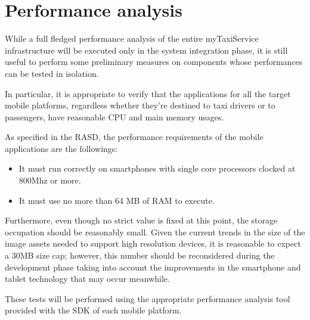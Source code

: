 \chapter{Performance analysis}
While a full fledged performance analysis of the entire myTaxiService infrastructure will be executed only in the system integration phase, it is still useful to perform some preliminary measures on components whose performances can be tested in isolation.

In particular, it is appropriate to verify that the applications for all the target mobile platforms, regardless whether they're destined to taxi drivers or to passengers, have reasonable CPU and main memory usages. 

As specified in the RASD, the performance requirements of the mobile applications are the followings:
\begin{itemize}
	\item It must run correctly on smartphones with single core processors clocked at 800Mhz or more.
	\item It must use no more than 64 MB of RAM to execute.
\end{itemize}

Furthermore, even though no strict value is fixed at this point, the storage occupation should be reasonably small. Given the current trends in the size of the image assets needed to support high resolution devices, it is reasonable to expect a 30MB size cap; however, this number should be reconsidered during the development phase taking into account the improvements in the smartphone and tablet technology that may occur meanwhile.

These tests will be performed using the appropriate performance analysis tool provided with the SDK of each mobile platform. 